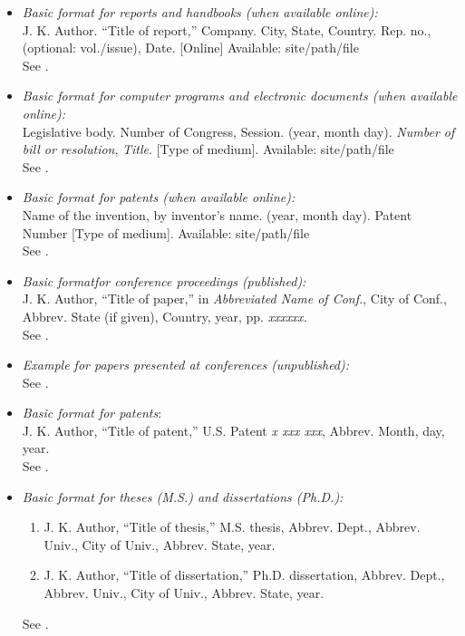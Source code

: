 \documentclass{ieeeaccess}
\begin{document}
\begin{itemize}
\item \emph{Basic format for reports and handbooks (when available online):}\\
J. K. Author. ``Title of report,'' Company. City, State, Country. Rep. no., (optional: vol./issue), Date. [Online] Available: site/path/file\\
See \cite{b18,b19}.

\item \emph{Basic format for computer programs and electronic documents (when available online): }\\
Legislative body. Number of Congress, Session. (year, month day). \emph{Number of bill or resolution}, \emph{Title}. [Type of medium]. Available: site/path/file\\
See \cite{b20}.

\item \emph{Basic format for patents (when available online):}\\
Name of the invention, by inventor's name. (year, month day). Patent Number [Type of medium]. Available: site/path/file\\
See \cite{b21}.

\item \emph{Basic format}\emph{for conference proceedings (published):}\\
J. K. Author, ``Title of paper,'' in \emph{Abbreviated Name of Conf.}, City of Conf., Abbrev. State (if given), Country, year, pp. \emph{xxxxxx.}\\
See \cite{b22}.

\item \emph{Example for papers presented at conferences (unpublished):}\\
See \cite{b23}.

\item \emph{Basic format for patents}$:$\\
J. K. Author, ``Title of patent,'' U.S. Patent \emph{x xxx xxx}, Abbrev. Month, day, year.\\
See \cite{b24}.

\item \emph{Basic format for theses (M.S.) and dissertations (Ph.D.):}
\begin{enumerate}
\item J. K. Author, ``Title of thesis,'' M.S. thesis, Abbrev. Dept., Abbrev. Univ., City of Univ., Abbrev. State, year.
\item J. K. Author, ``Title of dissertation,'' Ph.D. dissertation, Abbrev. Dept., Abbrev. Univ., City of Univ., Abbrev. State, year.
\end{enumerate}
See \cite{b25,b26}.


\end{itemize}
\end{document}

